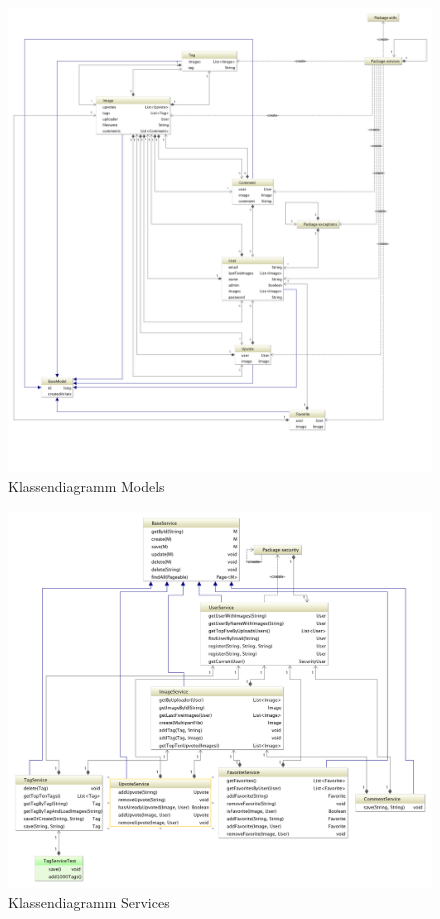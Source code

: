 \documentclass[12pt, oneside, a4paper]{article}		%
\begin{document}
\begin{figure}[H]
	\centering
	\includegraphics[width=\linewidth]{footage/ZIMG_ClassDiagram_Models}
	\caption{Klassendiagramm Models}
	\label{ClassDiagramModels}
\end{figure}

\begin{figure}[H]
	\centering
	\includegraphics[width=\linewidth]{footage/ZIMG_ClassDiagram_Services} 
	\caption{Klassendiagramm Services}
	\label{ClassDiagramServices}
\end{figure}
\end{document}
